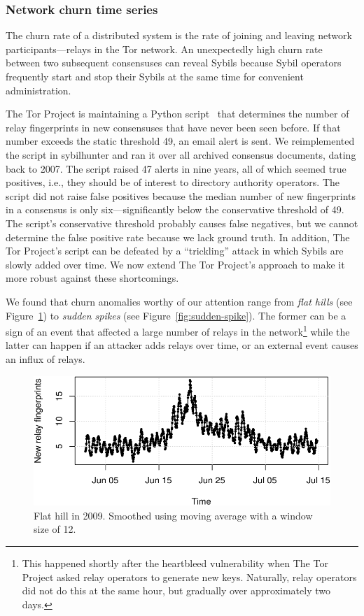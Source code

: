 \subsubsection{Network churn time series}
\label{sec:churn-time-series}
The churn rate of a distributed system is the rate of joining and leaving
network participants---relays in the Tor network.  An unexpectedly high churn
rate between two subsequent consensuses can reveal Sybils because Sybil
operators frequently start and stop their Sybils at the same time for convenient
administration.

The Tor Project is maintaining a Python script~\cite{doctor} that determines the
number of relay fingerprints in new consensuses that have never been seen
before.  If that number exceeds the static threshold 49, an email alert is sent.
We reimplemented the script in sybilhunter and ran it over all archived
consensus documents, dating back to 2007.  The script raised 47 alerts in nine
years, all of which seemed true positives, i.e., they should be of interest to
directory authority operators.  The script did not raise false positives because
the median number of new fingerprints in a consensus is only six---significantly
below the conservative threshold of 49.  The script's conservative threshold
probably causes false negatives, but we cannot determine the false positive rate
because we lack ground truth.  In addition, The Tor Project's script can be
defeated by a ``trickling'' attack in which Sybils are slowly added over time.
We now extend The Tor Project's approach to make it more robust against these
shortcomings.

We found that churn anomalies worthy of our attention range from \emph{flat
hills} (see Figure~\ref{fig:flat-hill}) to \emph{sudden spikes} (see
Figure~\ref{fig:sudden-spike}).  The former can be a sign of an event that
affected a large number of relays in the network\footnote{This happened shortly
after the heartbleed vulnerability when The Tor Project asked relay operators
to generate new keys.  Naturally, relay operators did not do this at the same
hour, but gradually over approximately two days.} while the latter can happen if
an attacker adds relays over time, or an external event causes an influx of
relays.

\begin{figure}[t]
	\centering
	\includegraphics[width=\linewidth]{diagrams/flat-hill.pdf}
	\caption{Flat hill in 2009.  Smoothed using moving average with a window
	size of 12.}
	\label{fig:flat-hill}
\end{figure}

